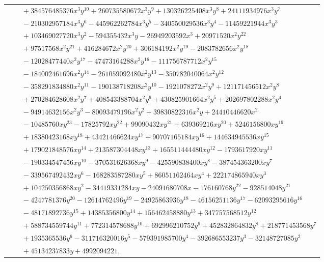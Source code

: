 \documentclass[11pt]{article}
\begin{document}
\begin{longtable}{@{}ll@{}}
 & $\quad +384576485376x^{3}y^{10}+260735580672x^{3}y^{9}+130326225408x^{3}y^{8}+24111934976x^{3}y^{7}$\\
 & $\quad -210302957184x^{3}y^{6}-445962262784x^{3}y^{5}-340550029536x^{3}y^{4}-11459221944x^{3}y^{3}$\\
 & $\quad +103469027720x^{3}y^{2}-594355432x^{3}y-26949203592x^{3}+20971520x^{2}y^{22}$\\
 & $\quad +97517568x^{2}y^{21}+416284672x^{2}y^{20}+306184192x^{2}y^{19}-2083782656x^{2}y^{18}$\\
 & $\quad -12028477440x^{2}y^{17}-47473164288x^{2}y^{16}-111756787712x^{2}y^{15}$\\
 & $\quad -184002461696x^{2}y^{14}-261059092480x^{2}y^{13}-350782040064x^{2}y^{12}$\\
 & $\quad -358291834880x^{2}y^{11}-190138718208x^{2}y^{10}-1921078272x^{2}y^{9}+121171456512x^{2}y^{8}$\\
 & $\quad +270284628608x^{2}y^{7}+408543388704x^{2}y^{6}+430825901664x^{2}y^{5}+202697802288x^{2}y^{4}$\\
 & $\quad -94914632156x^{2}y^{3}-80093479196x^{2}y^{2}+39830822316x^{2}y+24410446620x^{2}$\\
 & $\quad -10485760xy^{23}-17825792xy^{22}+99090432xy^{21}+639369216xy^{20}+5246156800xy^{19}$\\
 & $\quad +18380423168xy^{18}+43421466624xy^{17}+90707165184xy^{16}+144634945536xy^{15}$\\
 & $\quad +179021848576xy^{14}+213587304448xy^{13}+165511444480xy^{12}-1793617920xy^{11}$\\
 & $\quad -190334547456xy^{10}-370531626368xy^{9}-425590838400xy^{8}-387454363200xy^{7}$\\
 & $\quad -339567492432xy^{6}-168283587280xy^{5}+86051162464xy^{4}+222174865940xy^{3}$\\
 & $\quad +104250356868xy^{2}-34419331284xy-24091680708x-176160768y^{22}-928514048y^{21}$\\
 & $\quad -4247781376y^{20}-12614762496y^{19}-24925863936y^{18}-46156251136y^{17}-62093295616y^{16}$\\
 & $\quad -48171892736y^{15}+14385356800y^{14}+156462458880y^{13}+347757568512y^{12}$\\
 & $\quad +588734559744y^{11}+772314578688y^{10}+692996210752y^{9}+452832864832y^{8}+218771453568y^{7}$\\
 & $\quad +1935365536y^{6}-311716320016y^{5}-579391985700y^{4}-392686553237y^{3}-32148727085y^{2}$\\
 & $\quad +45134237833y+4992094221,$\\

\end{longtable}
\end{document}
